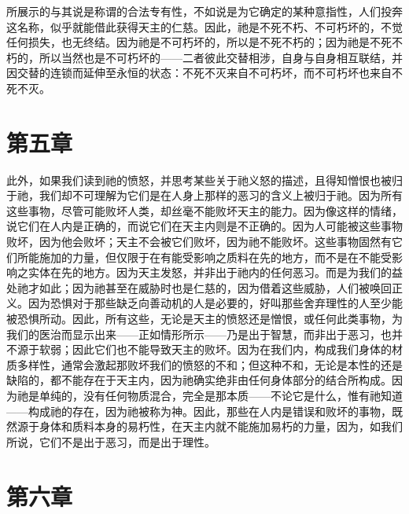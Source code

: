 所展示的与其说是称谓的合法专有性，不如说是为它确定的某种意指性，人们投奔这名称，似乎就能借此获得天主的仁慈。因此，祂是不死不朽、不可朽坏的，不觉任何损失，也无终结。因为祂是不可朽坏的，所以是不死不朽的；因为祂是不死不朽的，所以当然也是不可朽坏的——二者彼此交替相涉，自身与自身相互联结，并因交替的连锁而延伸至永恒的状态：不死不灭来自不可朽坏，而不可朽坏也来自不死不灭。\par


\section{第五章}

\par

此外，如果我们读到祂的愤怒，并思考某些关于祂义怒的描述，且得知憎恨也被归于祂，我们却不可理解为它们是在人身上那样的恶习的含义上被归于祂。因为所有这些事物，尽管可能败坏人类，却丝毫不能败坏天主的能力。因为像这样的情绪，说它们在人内是正确的，而说它们在天主内则是不正确的。因为人可能被这些事物败坏，因为他会败坏；天主不会被它们败坏，因为祂不能败坏。这些事物固然有它们所能施加的力量，但仅限于在有能受影响之质料在先的地方，而不是在不能受影响之实体在先的地方。因为天主发怒，并非出于祂内的任何恶习。而是为我们的益处祂才如此；因为祂甚至在威胁时也是仁慈的，因为借着这些威胁，人们被唤回正义。因为恐惧对于那些缺乏向善动机的人是必要的，好叫那些舍弃理性的人至少能被恐惧所动。因此，所有这些，无论是天主的愤怒还是憎恨，或任何此类事物，为我们的医治而显示出来——正如情形所示——乃是出于智慧，而非出于恶习，也并不源于软弱；因此它们也不能导致天主的败坏。因为在我们内，构成我们身体的材质多样性，通常会激起那败坏我们的愤怒的不和；但这种不和，无论是本性的还是缺陷的，都不能存在于天主内，因为祂确实绝非由任何身体部分的结合所构成。因为祂是单纯的，没有任何物质混合，完全是那本质——不论它是什么，惟有祂知道——构成祂的存在，因为祂被称为神。因此，那些在人内是错误和败坏的事物，既然源于身体和质料本身的易朽性，在天主内就不能施加易朽的力量，因为，如我们所说，它们不是出于恶习，而是出于理性。\par


\section{第六章}

